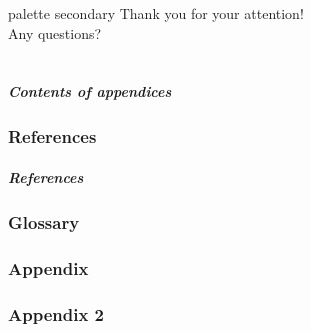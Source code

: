 \documentclass[%
aspectratio=169,%
xcolor=table,%
]{beamer}
\begin{document}
 
    \begin{frame}
        [endframe,t]
        \centering\inserttitlegraphic\par
        \vfill
        \begin{beamercolorbox}[sep=4pt,center,rounded=true,shadow=true]{palette secondary}
            Thank you for your attention!\\
            Any questions?
        \end{beamercolorbox}
    \end{frame}

    \part{}
    \begin{frame}
        \frametitle{Contents of appendices}
        \tableofcontents
    \end{frame}

    \backupbegin
    \section{References}
    \begin{frame}[allowframebreaks]
        \frametitle{References}
        \printbibliography
    \end{frame}

    \section{Glossary}
    
    \section{Appendix}
    
    \section{Appendix 2}
    

    \backupend
 
\end{document}
